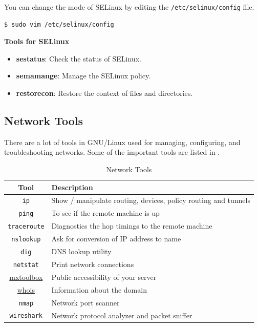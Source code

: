 You can change the mode of SELinux by editing the
\lstinline|/etc/selinux/config| file.

\begin{lstlisting}[language=bash]
$ sudo vim /etc/selinux/config
\end{lstlisting}

\textbf{Tools for SELinux}

\begin{itemize}
  \item \textbf{sestatus}: Check the status of SELinux.
  \item \textbf{semamange}: Manage the SELinux policy.
  \item \textbf{restorecon}: Restore the context of files
    and directories.
\end{itemize}


\subsection{Network Tools}

There are a lot of tools in GNU/Linux used for managing,
configuring, and troubleshooting networks. Some of the
important tools are listed in .

\begin{table}[h!]
  \caption{Network Tools}
  \begin{tabularx}{\linewidth}{c >{\raggedright\arraybackslash}X}
    \toprule
    \textbf{Tool} & \textbf{Description} \\
    \midrule
    \lstinline|ip| & Show / manipulate routing, devices, policy routing and tunnels \\
    \lstinline|ping| & To see if the remote machine is up \\
    \lstinline|traceroute| & Diagnostics the hop timings to the remote machine \\
    \lstinline|nslookup| & Ask for conversion of IP address to name \\
    \lstinline|dig| & DNS lookup utility \\
    \lstinline|netstat| & Print network connections \\
    \href{https://mxtoolbox.com/}{mxtoolbox} & Public accessibility of your server \\
    \href{https://whois.com/}{whois} & Information about the domain \\
    \lstinline|nmap| & Network port scanner \\
    \lstinline|wireshark| & Network protocol analyzer and packet sniffer \\
    \bottomrule
  \end{tabularx}
\end{table}

